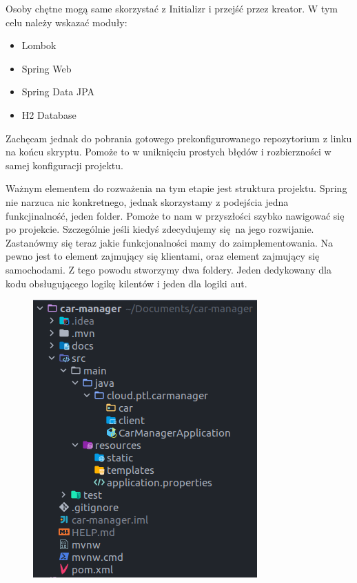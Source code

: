 \documentclass{article}
\begin{document}
        Osoby chętne mogą same skorzystać z Initializr i przejść przez kreator. W tym celu należy wskazać moduły:
        \begin{itemize}
            \item Lombok
            \item Spring Web
            \item Spring Data JPA
            \item H2 Database
        \end{itemize}
        Zachęcam jednak do pobrania gotowego prekonfigurowanego repozytorium z linku na końcu skryptu. Pomoże to w uniknięciu prostych błędów i rozbierzności w samej konfiguracji projektu. 
        
        Ważnym elementem do rozważenia na tym etapie jest struktura projektu. Spring nie narzuca nic konkretnego, jednak skorzystamy z podejścia jedna funkcjinalność, jeden folder. Pomoże to nam w przyszłości szybko nawigować się po projekcie. Szczególnie jeśli kiedyś zdecydujemy się na jego rozwijanie. Zastanówmy się teraz jakie funkcjonalności mamy do zaimplementowania. Na pewno jest to element zajmujący się klientami, oraz element zajmujący się samochodami. Z tego powodu stworzymy dwa foldery. Jeden dedykowany dla kodu obsługującego logikę kilentów i jeden dla logiki aut.
        
        \begin{figure}[h]
            \centering
            \includegraphics{tree.png}
        \end{figure}
    
\end{document}
